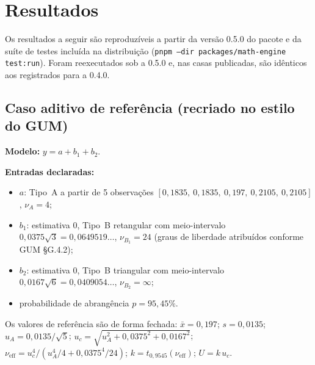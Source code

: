 \documentclass[11pt,a4paper]{article}
\newcommand{\docVersion}{0.5.0}
\newcommand{\previousVersion}{0.4.0}
\begin{document}
\section{Resultados}
\label{sec:resultados}

Os resultados a seguir são reproduzíveis a partir da versão \docVersion{} do pacote e da suíte de testes incluída na distribuição (\texttt{pnpm --dir packages/math-engine test:run}). Foram reexecutados sob a \docVersion{} e, nas casas publicadas, são idênticos aos registrados para a \previousVersion{}.

\subsection{Caso aditivo de referência (recriado no estilo do GUM)}

\textbf{Modelo:} \(y = a + b_1 + b_2\).

\textbf{Entradas declaradas:}
\begin{itemize}
  \item \(a\): Tipo~A a partir de 5 observações \([0{,}1835,\ 0{,}1835,\ 0{,}197,\ 0{,}2105,\ 0{,}2105]\), \(\nu_A = 4\);
  \item \(b_1\): estimativa 0, Tipo~B retangular com meio-intervalo \(0{,}0375\sqrt{3} = 0{,}0649519\ldots\), \(\nu_{B_1} = 24\) (graus de liberdade atribuídos conforme GUM §G.4.2);
  \item \(b_2\): estimativa 0, Tipo~B triangular com meio-intervalo \(0{,}0167\sqrt{6} = 0{,}0409054\ldots\), \(\nu_{B_2} = \infty\);
  \item probabilidade de abrangência \(p = 95{,}45\%\).
\end{itemize}

Os valores de referência são de forma fechada: \(\bar{x} = 0{,}197\); \(s = 0{,}0135\); \(u_A = 0{,}0135/\sqrt{5}\); \(u_c = \sqrt{u_A^2 + 0{,}0375^2 + 0{,}0167^2}\); \(\nu_{\text{eff}} = u_c^4 / (u_A^4/4 + 0{,}0375^4/24)\); \(k = t_{0{,}9545}(\nu_{\text{eff}})\); \(U = k\,u_c\).
\end{document}
